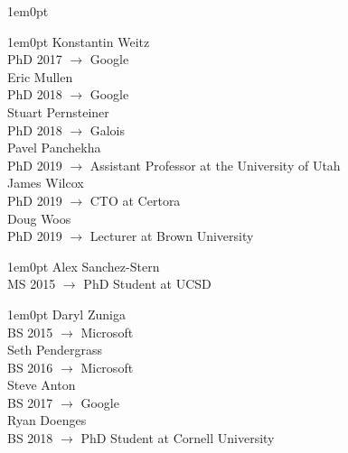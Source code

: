 \documentclass[11pt,letterpaper]{article}
\newcommand{\cvSection}[1]{\vspace{1em}{\Large #1}}
\newcommand{\cvSectionIndent}[0]{1em}
\newcommand{\cvSubSection}[1]{\vspace{0.1em}{\large #1}}
\newcommand{\cvSubSectionIndent}[0]{1em}
\begin{document}
\cvSection{Graduated Students}
\begin{adjustwidth}{\cvSectionIndent}{0pt}

  \cvSubSection{PhD}
  \begin{adjustwidth}{\cvSubSectionIndent}{0pt}
    Konstantin Weitz \\
    PhD 2017 $\rightarrow$ Google \\

    Eric Mullen \\
    PhD 2018 $\rightarrow$ Google \\

    Stuart Pernsteiner \\
    PhD 2018 $\rightarrow$ Galois \\

    Pavel Panchekha \\
    PhD 2019 $\rightarrow$ Assistant Professor at the University of Utah \\

    James Wilcox \\
    PhD 2019 $\rightarrow$ CTO at Certora \\

    Doug Woos \\
    PhD 2019 $\rightarrow$ Lecturer at Brown University \\

  \end{adjustwidth}

  \cvSubSection{Masters}
  \begin{adjustwidth}{\cvSubSectionIndent}{0pt}
    Alex Sanchez-Stern \\
    MS 2015 $\rightarrow$ PhD Student at UCSD \\
  \end{adjustwidth}

  \cvSubSection{Undergraduate}
  \begin{adjustwidth}{\cvSubSectionIndent}{0pt}
    Daryl Zuniga \\
    BS 2015 $\rightarrow$ Microsoft \\

    Seth Pendergrass \\
    BS 2016 $\rightarrow$ Microsoft \\

    Steve Anton \\
    BS 2017 $\rightarrow$ Google \\

    Ryan Doenges \\
    BS 2018 $\rightarrow$ PhD Student at Cornell University \\


\end{adjustwidth}
\end{adjustwidth}
\end{document}
